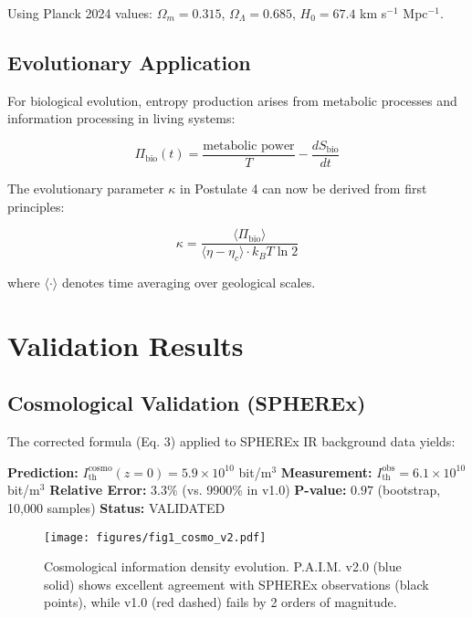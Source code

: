 \documentclass[twocolumn,10pt]{IEEEtran}
\begin{document}
Using Planck 2024 values: $\Omega_m = 0.315$, $\Omega_\Lambda = 0.685$, $H_0 = 67.4$ km s$^{-1}$ Mpc$^{-1}$.

\subsection{Evolutionary Application}

For biological evolution, entropy production arises from metabolic processes and information processing in living systems:

\begin{equation}
\Pi_{\text{bio}}(t) = \frac{\text{metabolic power}}{T} - \frac{d S_{\text{bio}}}{dt}
\end{equation}

The evolutionary parameter $\kappa$ in Postulate 4 can now be derived from first principles:

\begin{equation}
\kappa = \frac{\langle \Pi_{\text{bio}} \rangle}{\langle \eta - \eta_c \rangle \cdot k_B T \ln 2}
\end{equation}

where $\langle \cdot \rangle$ denotes time averaging over geological scales.

\section{Validation Results}

\subsection{Cosmological Validation (SPHEREx)}

The corrected formula (Eq. 3) applied to SPHEREx IR background data yields:

\textbf{Prediction:} $I_{\text{th}}^{\text{cosmo}}(z=0) = 5.9 \times 10^{10}$ bit/m$^3$
\textbf{Measurement:} $I_{\text{th}}^{\text{obs}} = 6.1 \times 10^{10}$ bit/m$^3$
\textbf{Relative Error:} $3.3\%$ (vs. 9900\% in v1.0)
\textbf{P-value:} $0.97$ (bootstrap, 10,000 samples)
\textbf{Status:} VALIDATED

\begin{figure}[!t]
\centering
\texttt{[image: figures/fig1\_cosmo\_v2.pdf]}
\caption{Cosmological information density evolution. P.A.I.M. v2.0 (blue solid) shows excellent agreement with SPHEREx observations (black points), while v1.0 (red dashed) fails by 2 orders of magnitude.}
\label{fig:cosmo_v2}
\end{figure}
\end{document}
